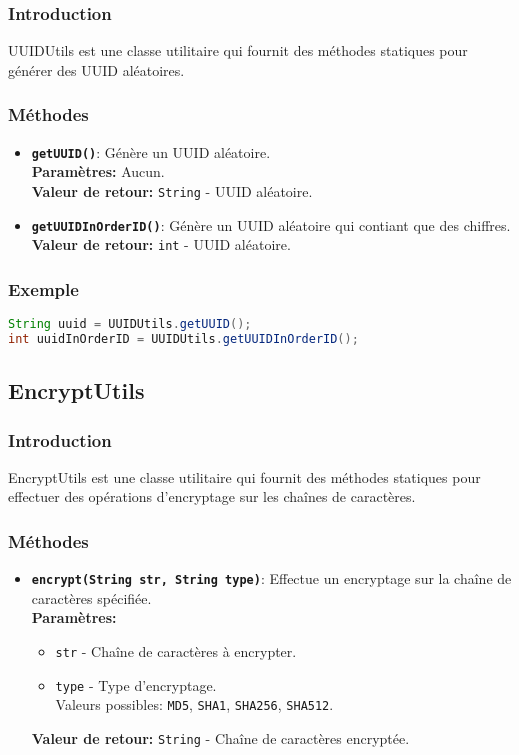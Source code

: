\documentclass{article}
\begin{document}
\subsubsection{Introduction}
UUIDUtils est une classe utilitaire qui fournit des méthodes statiques pour générer des UUID aléatoires.
\subsubsection{Méthodes}
\begin{itemize}
  \item \textbf{\texttt{getUUID()}}: Génère un UUID aléatoire.\\
  \textbf{Paramètres:} Aucun.\\
  \textbf{Valeur de retour:} \texttt{String} - UUID aléatoire.
  \item \textbf{\texttt{getUUIDInOrderID()}}: Génère un UUID aléatoire qui contiant que des chiffres.\\
  \textbf{Valeur de retour:} \texttt{int} - UUID aléatoire.
\end{itemize}
\subsubsection{Exemple}
\begin{lstlisting}[language=Java]
String uuid = UUIDUtils.getUUID();
int uuidInOrderID = UUIDUtils.getUUIDInOrderID();
\end{lstlisting}
\subsection{EncryptUtils}
\subsubsection{Introduction}
EncryptUtils est une classe utilitaire qui fournit des méthodes statiques pour effectuer des opérations d'encryptage sur les chaînes de caractères.
\subsubsection{Méthodes}
\begin{itemize}
  \item \textbf{\texttt{encrypt(String str, String type)}}: Effectue un encryptage sur la chaîne de caractères spécifiée.\\
  \textbf{Paramètres:}
  \begin{itemize}
    \item \texttt{str} - Chaîne de caractères à encrypter.
    \item \texttt{type} - Type d'encryptage.\\
    Valeurs possibles: \texttt{MD5}, \texttt{SHA1}, \texttt{SHA256}, \texttt{SHA512}.
  \end{itemize}
  \textbf{Valeur de retour:} \texttt{String} - Chaîne de caractères encryptée.
\end{itemize}
\end{document}
